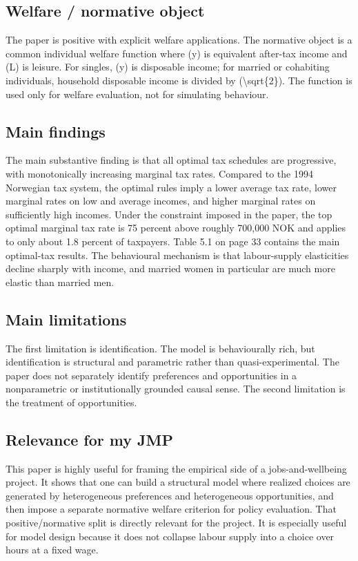 \documentclass[11pt,a4paper]{article}
\begin{document}
\subsection*{Welfare / normative object}
The paper is positive with explicit welfare applications. The normative object is a common individual welfare function where (y) is equivalent after-tax income and (L) is leisure. For singles, (y) is disposable income; for married or cohabiting individuals, household disposable income is divided by (\textbackslash{}sqrt\{2\}). The function is used only for welfare evaluation, not for simulating behaviour.

\subsection*{Main findings}
The main substantive finding is that all optimal tax schedules are progressive, with monotonically increasing marginal tax rates. Compared to the 1994 Norwegian tax system, the optimal rules imply a lower average tax rate, lower marginal rates on low and average incomes, and higher marginal rates on sufficiently high incomes. Under the constraint imposed in the paper, the top optimal marginal tax rate is 75 percent above roughly 700,000 NOK and applies to only about 1.8 percent of taxpayers. Table 5.1 on page 33 contains the main optimal-tax results. The behavioural mechanism is that labour-supply elasticities decline sharply with income, and married women in particular are much more elastic than married men.

\subsection*{Main limitations}
The first limitation is identification. The model is behaviourally rich, but identification is structural and parametric rather than quasi-experimental. The paper does not separately identify preferences and opportunities in a nonparametric or institutionally grounded causal sense. The second limitation is the treatment of opportunities.

\subsection*{Relevance for my JMP}
This paper is highly useful for framing the empirical side of a jobs-and-wellbeing project. It shows that one can build a structural model where realized choices are generated by heterogeneous preferences and heterogeneous opportunities, and then impose a separate normative welfare criterion for policy evaluation. That positive/normative split is directly relevant for the project. It is especially useful for model design because it does not collapse labour supply into a choice over hours at a fixed wage.
\end{document}
